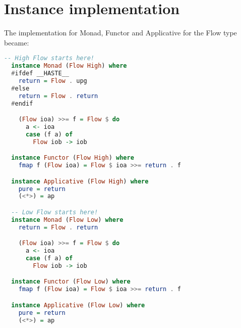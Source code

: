 \chapter{Instance implementation}
\label{app:instances}
The implementation for Monad, Functor and Applicative for the Flow type became:
\begin{lstlisting}[language=Haskell]
  -- High Flow starts here!
  instance Monad (Flow High) where
  #ifdef __HASTE__
    return = Flow . upg
  #else
    return = Flow . return
  #endif

    (Flow ioa) >>= f = Flow $ do
      a <- ioa
      case (f a) of
        Flow iob -> iob

  instance Functor (Flow High) where
    fmap f (Flow ioa) = Flow $ ioa >>= return . f

  instance Applicative (Flow High) where
    pure = return
    (<*>) = ap

  -- Low Flow starts here!
  instance Monad (Flow Low) where
    return = Flow . return

    (Flow ioa) >>= f = Flow $ do
      a <- ioa
      case (f a) of
        Flow iob -> iob

  instance Functor (Flow Low) where
    fmap f (Flow ioa) = Flow $ ioa >>= return . f

  instance Applicative (Flow Low) where
    pure = return
    (<*>) = ap
\end{lstlisting}
